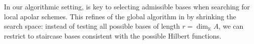 \documentclass[a4paper,11p]{amsart}
\newcommand{\m}{\mathfrak m}
\newcommand{\K}{\mathbb K}
\begin{document}

In our algorithmic setting,  is key to selecting admissible bases when searching for local apolar schemes. This refines  of the global algorithm in \cite{Alessandra} by  shrinking the search space: instead of testing all possible bases of length $r = \dim_\K A$, we can restrict to staircase bases consistent with the possible Hilbert functions.
\end{document}
